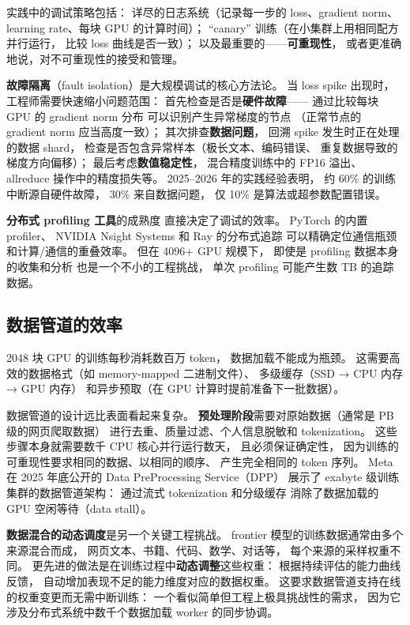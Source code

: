实践中的调试策略包括：
详尽的日志系统（记录每一步的 loss、gradient norm、
learning rate、每块 GPU 的计算时间）；
“canary” 训练（在小集群上用相同配方并行运行，
比较 loss 曲线是否一致）；
以及最重要的——\textbf{可重现性}，
或者更准确地说，对不可重现性的接受和管理。

\textbf{故障隔离}（fault isolation）是大规模调试的核心方法论。
当 loss spike 出现时，
工程师需要快速缩小问题范围：
首先检查是否是\textbf{硬件故障}——
通过比较每块 GPU 的 gradient norm 分布
可以识别产生异常梯度的节点
（正常节点的 gradient norm 应当高度一致）；
其次排查\textbf{数据问题}，
回溯 spike 发生时正在处理的数据 shard，
检查是否包含异常样本（极长文本、编码错误、
重复数据导致的梯度方向偏移）；
最后考虑\textbf{数值稳定性}，
混合精度训练中的 FP16 溢出、
allreduce 操作中的精度损失等。
2025--2026 年的实践经验表明，
约 60\% 的训练中断源自硬件故障，
30\% 来自数据问题，
仅 10\% 是算法或超参数配置错误。

\textbf{分布式 profiling 工具}的成熟度
直接决定了调试的效率。
PyTorch 的内置 profiler、
NVIDIA Nsight Systems 和 Ray 的分布式追踪
可以精确定位通信瓶颈和计算/通信的重叠效率。
但在 4096+ GPU 规模下，
即使是 profiling 数据本身的收集和分析
也是一个不小的工程挑战，
单次 profiling 可能产生数 TB 的追踪数据。

\subsection{数据管道的效率}

2048 块 GPU 的训练每秒消耗数百万 token，
数据加载不能成为瓶颈。
这需要高效的数据格式（如 memory-mapped 二进制文件）、
多级缓存（SSD → CPU 内存 → GPU 内存）
和异步预取（在 GPU 计算时提前准备下一批数据）。

数据管道的设计远比表面看起来复杂。
\textbf{预处理阶段}需要对原始数据（通常是 PB 级的网页爬取数据）
进行去重、质量过滤、个人信息脱敏和 tokenization。
这些步骤本身就需要数千 CPU 核心并行运行数天，
且必须保证确定性，
因为训练的可重现性要求相同的数据、以相同的顺序、
产生完全相同的 token 序列。
Meta 在 2025 年底公开的 Data PreProcessing Service（DPP）
展示了 exabyte 级训练集群的数据管道架构：
通过流式 tokenization 和分级缓存
消除了数据加载的 GPU 空闲等待（data stall）。

\textbf{数据混合的动态调度}是另一个关键工程挑战。
frontier 模型的训练数据通常由多个来源混合而成，
网页文本、书籍、代码、数学、对话等，
每个来源的采样权重不同。
更先进的做法是在训练过程中\textbf{动态调整}这些权重：
根据持续评估的能力曲线反馈，
自动增加表现不足的能力维度对应的数据权重。
这要求数据管道支持在线的权重变更而无需中断训练：
一个看似简单但工程上极具挑战性的需求，
因为它涉及分布式系统中数千个数据加载 worker 的同步协调。

